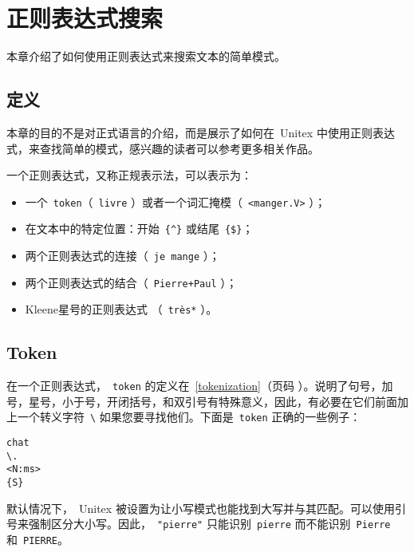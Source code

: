 \chapter{正则表达式搜索}
\label{chap-regexp}

本章介绍了如何使用正则表达式来搜索文本的简单模式。

\section{定义}

本章的目的不是对正式语言的介绍，而是展示了如何在\ Unitex 中使用正则表达式，来查找简单的模式，感兴趣的读者可以参考更多相关作品。


\bigskip \noindent 一个正则表达式，又称正规表示法，可以表示为：

\begin{itemize}
  \item 一个\ \verb+token+（\ \verb+livre+ ）或者一个词汇掩模（\ \verb+<manger.V>+ ）；
  \item 在文本中的特定位置：开始\ \verb+{^}+ 或结尾\ \verb+{$}+；
  \item 两个正则表达式的连接（\ \verb+je mange+ ）；
  \item 两个正则表达式的结合（\ \verb$Pierre+Paul$ ）； 
  \item Kleene星号的正则表达式 （\ \verb+très*+ ）。
\end{itemize}


\section{Token}

在一个正则表达式，\ \verb+token+ 的定义在\ \ref{tokenization}（页码 \pageref{tokenization}）。说明了句号，加号，星号，小于号，开闭括号，和双引号有特殊意义，因此，有必要在它们前面加上一个转义字符\ \verb+\+ 如果您要寻找他们。下面是\ \verb+token+ 正确的一些例子：\index{\verb+\+}

\begin{verbatim}
chat
\.
<N:ms>
{S}
\end{verbatim}

\noindent  默认情况下，\ Unitex 被设置为让小写模式也能找到大写并与其匹配。可以使用引号来强制区分大小写。因此，\ \verb+"pierre"+ 只能识别\ \verb+pierre+ 而不能识别\ \verb+Pierre+ 和\ \verb+PIERRE+。

